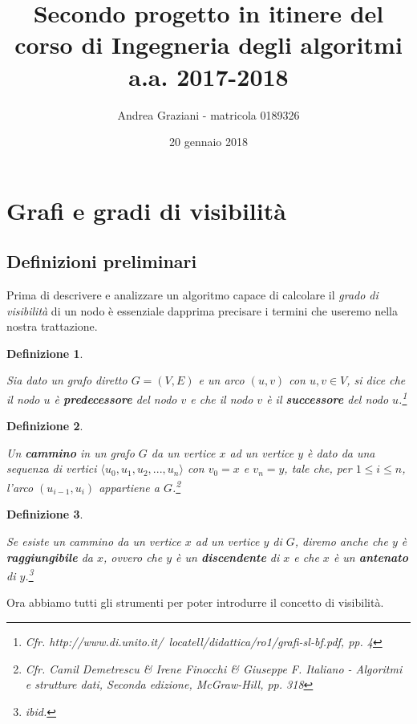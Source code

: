 \documentclass[10pt,a4paper,titlepage]{article}
\title{Secondo progetto in itinere del corso di Ingegneria degli algoritmi a.a. 2017-2018}
\author{Andrea Graziani - matricola 0189326}
\date{20 gennaio 2018}
\newtheorem{thm}{Definizione}
\begin{document}
\maketitle
\tableofcontents
\newpage


\section{Grafi e gradi di visibilità}

\subsection{Definizioni preliminari}

Prima di descrivere e analizzare un algoritmo capace di calcolare il \textit{grado di visibilità} di un nodo è essenziale dapprima precisare i termini che useremo nella nostra trattazione.

\begin{thm}\label{thm:def1}

Sia dato un grafo diretto $G = (V, E)$ e un arco $(u, v)$ con $u, v \in V$, si dice che il nodo $u$ è \textbf{predecessore} del nodo $v$ e che il nodo $v$ è il \textbf{successore} del nodo $u$.\footnote{Cfr. http://www.di.unito.it/~locatell/didattica/ro1/grafi-sl-bf.pdf, pp. 4}
\end{thm}


\begin{thm}\label{thm:def2}

Un \textbf{cammino} in un grafo $G$ da un vertice $x$ ad un vertice $y$ è dato da una sequenza di vertici $\langle u_0, u_1, u_2, ..., u_n\rangle$ con $v_0 = x$ e $v_n = y$, tale che, per $1 \leq i \leq n$, l'arco $(u_{i-1}, u_i)$ appartiene a $G$.\footnote{Cfr. Camil Demetrescu \& Irene Finocchi \& Giuseppe F. Italiano - \textit{Algoritmi e strutture dati, Seconda edizione}, McGraw-Hill, pp. 318}

\end{thm}

\begin{thm}\label{thm:def3}

Se esiste un cammino da un vertice $x$ ad un vertice $y$ di $G$, diremo anche che $y$ è \textbf{raggiungibile} da $x$, ovvero che $y$ è un \textbf{discendente} di $x$ e che $x$ è un \textbf{antenato} di $y$.\footnote{\textit{ibid.}}

\end{thm}

Ora abbiamo tutti gli strumenti per poter introdurre il concetto di visibilità.
\end{document}
